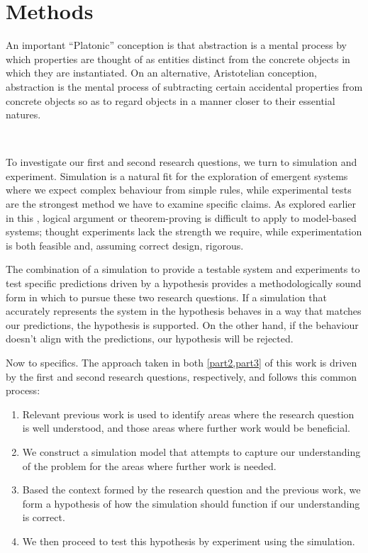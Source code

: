 \section{Methods}\label{approach}

\epigraph{%
An important ``Platonic'' conception is that abstraction is a mental process by which properties are thought of as entities distinct from the concrete objects in which they are instantiated. On an alternative, Aristotelian conception, abstraction is the mental process of subtracting certain accidental properties from concrete objects so as to regard objects in a manner closer to their essential natures.}%
{\textsc{\\\textcite{Griesemer2005}}}

To investigate our first and second research questions, we turn to simulation and experiment. Simulation is a natural fit for the exploration of emergent systems where we expect complex behaviour from simple rules, while experimental tests are the strongest method we have to examine specific claims. As explored earlier in this , logical argument or theorem-proving is difficult to apply to model-based systems; thought experiments lack the strength we require, while experimentation is both feasible and, assuming correct design, rigorous. 

The combination of a simulation to provide a testable system and experiments to test specific predictions driven by a hypothesis provides a methodologically sound form in which to pursue these two research questions. If a simulation that accurately represents the system in the hypothesis behaves in a way that matches our predictions, the hypothesis is supported. On the other hand, if the behaviour doesn't align with the predictions, our hypothesis will be rejected.

Now to specifics. The approach taken in both \cref{part2,part3} of this work is driven by the first and second research questions, respectively, and follows this common process:
\begin{enumerate}
	\item Relevant previous work is used to identify areas where the research question is well understood, and those areas where further work would be beneficial.
	\item We construct a simulation model that attempts to capture our understanding of the problem for the areas where further work is needed.
	\item Based the context formed by the research question and the previous work, we form a hypothesis of how the simulation should function if our understanding is correct.
	\item We then proceed to test this hypothesis by experiment using the simulation.
\end{enumerate}

